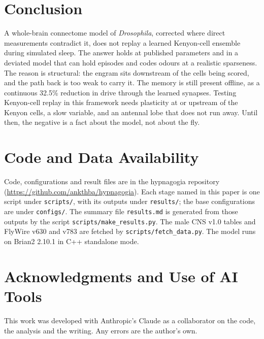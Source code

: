 \documentclass[11pt]{article}
\newcommand{\Dm}{\emph{Drosophila}}
\begin{document}
\section{Conclusion}
A whole-brain connectome model of \Dm{}, corrected where direct measurements contradict it, does not replay a learned Kenyon-cell ensemble during simulated sleep. The answer holds at published parameters and in a deviated model that can hold episodes and codes odours at a realistic sparseness. The reason is structural: the engram sits downstream of the cells being scored, and the path back is too weak to carry it. The memory is still present offline, as a continuous 32.5\% reduction in drive through the learned synapses. Testing Kenyon-cell replay in this framework needs plasticity at or upstream of the Kenyon cells, a slow variable, and an antennal lobe that does not run away. Until then, the negative is a fact about the model, not about the fly.

\section*{Code and Data Availability}
Code, configurations and result files are in the hypnagogia repository (\url{https://github.com/ankthba/hypnagogia}). Each stage named in this paper is one script under \texttt{scripts/}, with its outputs under \texttt{results/}; the base configurations are under \texttt{configs/}. The summary file \texttt{results.md} is generated from those outputs by the script \texttt{scripts/make\_results.py}. The male CNS v1.0 tables and FlyWire v630 and v783 are fetched by \texttt{scripts/fetch\_data.py}. The model runs on Brian2 2.10.1 in C++ standalone mode.

\section*{Acknowledgments and Use of AI Tools}
This work was developed with Anthropic's Claude as a collaborator on the code, the analysis and the writing. Any errors are the author's own.



\end{document}
